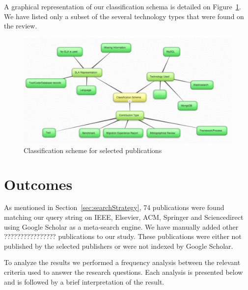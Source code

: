 \documentclass{article}
\begin{document}
A graphical representation of our classification schema is detailed on Figure~\ref{fig:classificationSchema}. We have listed only a subset of the several technology types that were found on the review.

\begin{figure}[!h]
\centering
\includegraphics[width=130mm]{classificationSchema.png}
\caption{Classification scheme for selected publications \label{fig:classificationSchema}}
\end{figure}



\section{Outcomes}
\label{sec:outcomes}

As mentioned in Section~\ref{sec:searchStrategy}, 74 publications were found matching our query string on IEEE, Elsevier, ACM, Springer and Sciencedirect using Google Scholar as a meta-search engine. We have manually added other ???????????????? publications to our study. These publications were either not published by the selected publishers or were not indexed by Google Scholar. 

To analyze the results we performed a frequency analysis between the relevant criteria used to answer the research questions. Each analysis is presented below and is followed by a brief interpretation of the result. 

\end{document}
